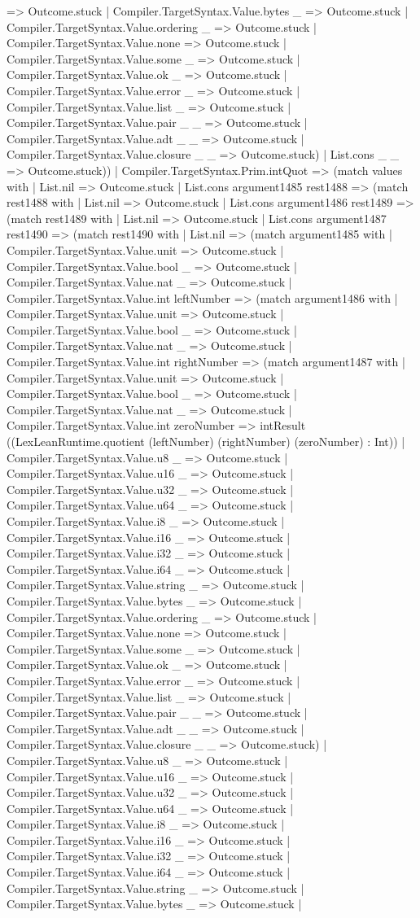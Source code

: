 \documentclass[11pt]{article}
\begin{document}
=> Outcome.stuck | Compiler.TargetSyntax.Value.bytes \_ => Outcome.stuck | Compiler.TargetSyntax.Value.ordering \_ => Outcome.stuck | Compiler.TargetSyntax.Value.none => Outcome.stuck | Compiler.TargetSyntax.Value.some \_ => Outcome.stuck | Compiler.TargetSyntax.Value.ok \_ => Outcome.stuck | Compiler.TargetSyntax.Value.error \_ => Outcome.stuck | Compiler.TargetSyntax.Value.list \_ => Outcome.stuck | Compiler.TargetSyntax.Value.pair \_ \_ => Outcome.stuck | Compiler.TargetSyntax.Value.adt \_ \_ => Outcome.stuck | Compiler.TargetSyntax.Value.closure \_ \_ => Outcome.stuck) | List.cons \_ \_ => Outcome.stuck)) | Compiler.TargetSyntax.Prim.intQuot => (match values with | List.nil => Outcome.stuck | List.cons argument1485 rest1488 => (match rest1488 with | List.nil => Outcome.stuck | List.cons argument1486 rest1489 => (match rest1489 with | List.nil => Outcome.stuck | List.cons argument1487 rest1490 => (match rest1490 with | List.nil => (match argument1485 with | Compiler.TargetSyntax.Value.unit => Outcome.stuck | Compiler.TargetSyntax.Value.bool \_ => Outcome.stuck | Compiler.TargetSyntax.Value.nat \_ => Outcome.stuck | Compiler.TargetSyntax.Value.int leftNumber => (match argument1486 with | Compiler.TargetSyntax.Value.unit => Outcome.stuck | Compiler.TargetSyntax.Value.bool \_ => Outcome.stuck | Compiler.TargetSyntax.Value.nat \_ => Outcome.stuck | Compiler.TargetSyntax.Value.int rightNumber => (match argument1487 with | Compiler.TargetSyntax.Value.unit => Outcome.stuck | Compiler.TargetSyntax.Value.bool \_ => Outcome.stuck | Compiler.TargetSyntax.Value.nat \_ => Outcome.stuck | Compiler.TargetSyntax.Value.int zeroNumber => intResult ((LexLeanRuntime.quotient (leftNumber) (rightNumber) (zeroNumber) : Int)) | Compiler.TargetSyntax.Value.u8 \_ => Outcome.stuck | Compiler.TargetSyntax.Value.u16 \_ => Outcome.stuck | Compiler.TargetSyntax.Value.u32 \_ => Outcome.stuck | Compiler.TargetSyntax.Value.u64 \_ => Outcome.stuck | Compiler.TargetSyntax.Value.i8 \_ => Outcome.stuck | Compiler.TargetSyntax.Value.i16 \_ => Outcome.stuck | Compiler.TargetSyntax.Value.i32 \_ => Outcome.stuck | Compiler.TargetSyntax.Value.i64 \_ => Outcome.stuck | Compiler.TargetSyntax.Value.string \_ => Outcome.stuck | Compiler.TargetSyntax.Value.bytes \_ => Outcome.stuck | Compiler.TargetSyntax.Value.ordering \_ => Outcome.stuck | Compiler.TargetSyntax.Value.none => Outcome.stuck | Compiler.TargetSyntax.Value.some \_ => Outcome.stuck | Compiler.TargetSyntax.Value.ok \_ => Outcome.stuck | Compiler.TargetSyntax.Value.error \_ => Outcome.stuck | Compiler.TargetSyntax.Value.list \_ => Outcome.stuck | Compiler.TargetSyntax.Value.pair \_ \_ => Outcome.stuck | Compiler.TargetSyntax.Value.adt \_ \_ => Outcome.stuck | Compiler.TargetSyntax.Value.closure \_ \_ => Outcome.stuck) | Compiler.TargetSyntax.Value.u8 \_ => Outcome.stuck | Compiler.TargetSyntax.Value.u16 \_ => Outcome.stuck | Compiler.TargetSyntax.Value.u32 \_ => Outcome.stuck | Compiler.TargetSyntax.Value.u64 \_ => Outcome.stuck | Compiler.TargetSyntax.Value.i8 \_ => Outcome.stuck | Compiler.TargetSyntax.Value.i16 \_ => Outcome.stuck | Compiler.TargetSyntax.Value.i32 \_ => Outcome.stuck | Compiler.TargetSyntax.Value.i64 \_ => Outcome.stuck | Compiler.TargetSyntax.Value.string \_ => Outcome.stuck | Compiler.TargetSyntax.Value.bytes \_ => Outcome.stuck | 
\end{document}
